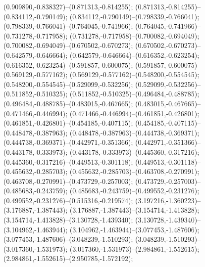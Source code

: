  (0.909890,-0.838327)--(0.871313,-0.814255);
 (0.871313,-0.814255)--(0.834112,-0.790149);
 (0.834112,-0.790149)--(0.798339,-0.766041);
 (0.798339,-0.766041)--(0.764045,-0.741966);
 (0.764045,-0.741966)--(0.731278,-0.717958);
 (0.731278,-0.717958)--(0.700082,-0.694049);
 (0.700082,-0.694049)--(0.670502,-0.670273);
 (0.670502,-0.670273)--(0.642579,-0.646664);
 (0.642579,-0.646664)--(0.616352,-0.623254);
 (0.616352,-0.623254)--(0.591857,-0.600075);
 (0.591857,-0.600075)--(0.569129,-0.577162);
 (0.569129,-0.577162)--(0.548200,-0.554545);
 (0.548200,-0.554545)--(0.529099,-0.532256);
 (0.529099,-0.532256)--(0.511852,-0.510325);
 (0.511852,-0.510325)--(0.496484,-0.488785);
 (0.496484,-0.488785)--(0.483015,-0.467665);
 (0.483015,-0.467665)--(0.471466,-0.446994);
 (0.471466,-0.446994)--(0.461851,-0.426801);
 (0.461851,-0.426801)--(0.454185,-0.407115);
 (0.454185,-0.407115)--(0.448478,-0.387963);
 (0.448478,-0.387963)--(0.444738,-0.369371);
 (0.444738,-0.369371)--(0.442971,-0.351366);
 (0.442971,-0.351366)--(0.443178,-0.333973);
 (0.443178,-0.333973)--(0.445360,-0.317216);
 (0.445360,-0.317216)--(0.449513,-0.301118);
 (0.449513,-0.301118)--(0.455632,-0.285703);
 (0.455632,-0.285703)--(0.463708,-0.270991);
 (0.463708,-0.270991)--(0.473729,-0.257003);
 (0.473729,-0.257003)--(0.485683,-0.243759);
 (0.485683,-0.243759)--(0.499552,-0.231276);
 (0.499552,-0.231276)--(0.515316,-0.219574);
 (3.197216,-1.360223)--(3.176887,-1.387443);
 (3.176887,-1.387443)--(3.154714,-1.413828);
 (3.154714,-1.413828)--(3.130728,-1.439340);
 (3.130728,-1.439340)--(3.104962,-1.463944);
 (3.104962,-1.463944)--(3.077453,-1.487606);
 (3.077453,-1.487606)--(3.048239,-1.510293);
 (3.048239,-1.510293)--(3.017360,-1.531973);
 (3.017360,-1.531973)--(2.984861,-1.552615);
 (2.984861,-1.552615)--(2.950785,-1.572192);
